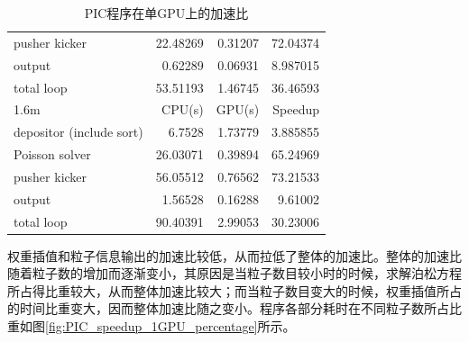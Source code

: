 \begin{table}
\begin{tabular}{|l|r|r|r|}
    pusher kicker            &    22.48269	  &     0.31207	  &  72.04374   \\
    output                   &    0.62289     &     0.06931   &  8.987015   \\
    total loop               &    53.51193    &     1.46745   &  36.46593   \\
    \hline
    1.6m                     &    CPU(s)      &     GPU(s)    &  Speedup    \\
    \hline
    depositor (include sort) &    6.7528      &     1.73779   &  3.885855   \\
    Poisson solver           &    26.03071    &     0.39894   &  65.24969   \\
    pusher kicker            &    56.05512	  &     0.76562	  &  73.21533   \\
    output                   &    1.56528     &     0.16288   &  9.61002    \\
    total loop               &    90.40391    &     2.99053   &  30.23006   \\
    \hline
  \end{tabular}
  \caption{PIC程序在单GPU上的加速比}
  \label{tab:PIC_speedup_1GPU}
\end{table}

权重插值和粒子信息输出的加速比较低，从而拉低了整体的加速比。整体的加速比随着粒子数的增加而逐渐变小，其原因是当粒子数目较小时的时候，求解泊松方程所占得比重较大，从而整体加速比较大；而当粒子数目变大的时候，权重插值所占的时间比重变大，因而整体加速比随之变小。程序各部分耗时在不同粒子数所占比重如图\ref{fig:PIC_speedup_1GPU_percentage}所示。

